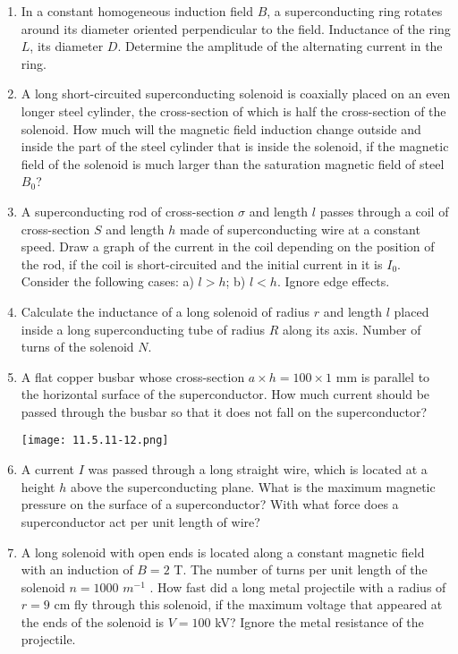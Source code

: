 \documentclass{article}
\begin{document}
\begin{enumerate}[label=11.5.\arabic*]
\item In a constant homogeneous induction field $B$, a superconducting ring rotates around its diameter oriented perpendicular to the field. Inductance of the ring $L$, its diameter $D$. Determine the amplitude of the alternating current in the ring.

\item A long short-circuited superconducting solenoid is coaxially placed on an even longer steel cylinder, the cross-section of which is half the cross-section of the solenoid. How much will the magnetic field induction change outside and inside the part of the steel cylinder that is inside the solenoid, if the magnetic field of the solenoid is much larger than the saturation magnetic field of steel $B_0$?

\item A superconducting rod of cross-section $\sigma$ and length $l$ passes through a coil of cross-section $S$ and length $h$ made of superconducting wire at a constant speed. Draw a graph of the current in the coil depending on the position of the rod, if the coil is short-circuited and the initial current in it is $I_0$. Consider the following cases: a) $l > h$; b) $l < h$. Ignore edge effects.


\item Calculate the inductance of a long solenoid of radius $r$ and length $l$ placed inside a long superconducting tube of radius $R$ along its axis. Number of turns of the solenoid $N$.

\item A flat copper busbar whose cross-section $a \times h = 100 \times 1$ mm is parallel to the horizontal surface of the superconductor. How much current should be passed through the busbar so that it does not fall on the superconductor?

\begin{center}
    \texttt{[image: 11.5.11-12.png]}
\end{center}


\item A current $I$ was passed through a long straight wire, which is located at a height $h$ above the superconducting plane. What is the maximum magnetic pressure on the surface of a superconductor? With what force does a superconductor act per unit length of wire?

\item A long solenoid with open ends is located along a constant magnetic field with an induction of $B = 2$ T. The number of turns per unit length of the solenoid $n = 1000$ $m^{-1}$ . How fast did a long metal projectile with a radius of $r = 9$ cm fly through this solenoid, if the maximum voltage that appeared at the ends of the solenoid is $V = 100$ kV? Ignore the metal resistance of the projectile.


\end{enumerate}
\end{document}
